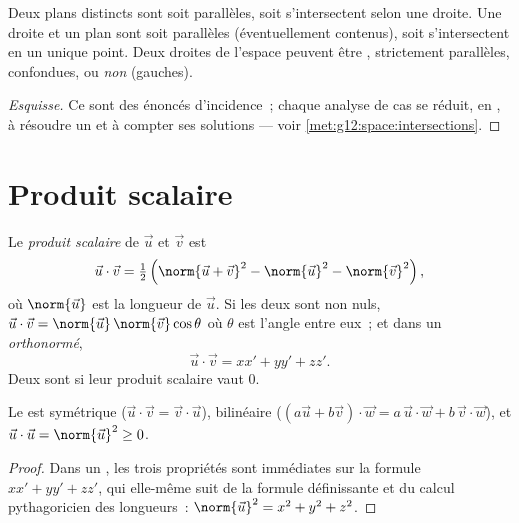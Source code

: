 \begin{proposition}\label{prop:g12:space:positions}
Deux plans distincts sont soit parallèles, soit s'intersectent selon une
droite. Une droite et un plan sont soit parallèles (éventuellement
contenus), soit s'intersectent en un unique point. Deux droites de l'espace
peuvent être , strictement parallèles, confondues, ou
\emph{non } (gauches).
\end{proposition}

\begin{proof}[Esquisse]
Ce sont des énoncés d'incidence~; chaque analyse de cas se réduit, en
, à résoudre un  et à compter ses solutions ---
voir \cref{met:g12:space:intersections}.
\end{proof}

\section{Produit scalaire}

\begin{definition}\label{def:g12:space:dot}
Le \emph{produit scalaire} de $\vec u$ et $\vec v$
est
\[
\vec u \cdot \vec v = \tfrac12\left(\norm{\vec u + \vec v}^2
- \norm{\vec u}^2 - \norm{\vec v}^2\right),
\]
où $\norm{\vec u}$ est la longueur de $\vec u$. Si les deux  sont
non nuls, $\vec u \cdot \vec v = \norm{\vec u}\,\norm{\vec v}\cos\theta$
où $\theta$ est l'angle entre eux~; et dans un  \emph{orthonormé},
\[
\vec u \cdot \vec v = xx' + yy' + zz' .
\]
Deux  sont \emph{} si leur produit scalaire vaut $0$.
\end{definition}

\begin{proposition}[Propriétés]\label{prop:g12:space:dotprops}
Le  est symétrique ($\vec u\cdot\vec v = \vec v\cdot\vec u$),
bilinéaire ($(a\vec u + b\vec v)\cdot \vec w = a\,\vec u\cdot\vec w +
b\,\vec v\cdot \vec w$), et
$\vec u \cdot \vec u = \norm{\vec u}^2 \geq 0$.
\end{proposition}

\begin{proof}
Dans un , les trois propriétés sont immédiates sur la
formule $xx' + yy' + zz'$, qui elle-même suit de la formule définissante et
du calcul pythagoricien des longueurs~:
$\norm{\vec u}^2 = x^2 + y^2 + z^2$.
\end{proof}

